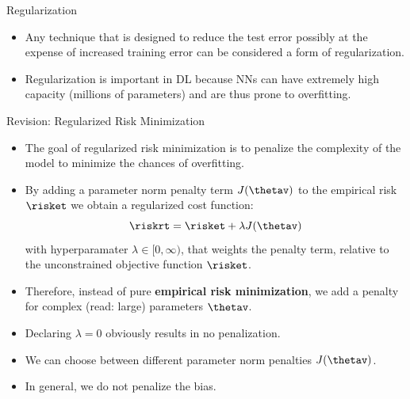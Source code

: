 \documentclass[11pt,compress,t,notes=noshow, xcolor=table]{beamer}
\begin{document}

\begin{frame} {Regularization}
\begin{itemize}
\item Any technique that is designed to reduce the test error possibly at the expense of increased training error can be considered a form of regularization.
\item Regularization is important in DL because NNs can have extremely high capacity (millions of parameters) and are thus prone to overfitting.
\end{itemize}
\end{frame}

\begin{vbframe}{Revision: Regularized Risk Minimization}
\begin{itemize}
\item The goal of regularized risk minimization is to penalize the complexity of the model to minimize the chances of overfitting.
\item By adding a parameter norm penalty term \(J(\thetav)\) to the empirical risk $\risket$ we obtain a regularized cost function:
$$\riskrt = \risket + \lambda \text{\(J(\thetav)\)}$$
with hyperparamater $\lambda \in [0, \infty)$, that weights the penalty term, relative to the unconstrained objective function $\risket$.
\item Therefore, instead of pure \textbf{empirical risk minimization}, we add a penalty
for complex (read: large) parameters \(\thetav\).
\item Declaring $\lambda = 0$ obviously results in no penalization.
\item We can choose between different parameter norm penalties \(J(\thetav)\).
\item In general, we do not penalize the bias.
\end{itemize}
\end{vbframe}
\end{document}
